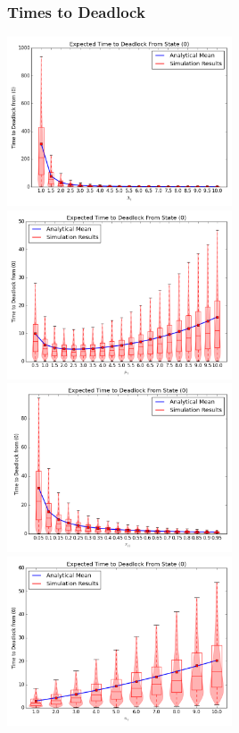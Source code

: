 \documentclass[xcolor={table}]{beamer}
\begin{document}
\begin{frame}
    \frametitle{Times to Deadlock}
    \includegraphics[width=0.5\textwidth]{varyL1_1node}
    \includegraphics[width=0.5\textwidth]{varymu1_1node}\newline
    \includegraphics[width=0.5\textwidth]{varyr11_1node}
    \includegraphics[width=0.5\textwidth]{varyn1_1node}
\end{frame}



\end{document}
